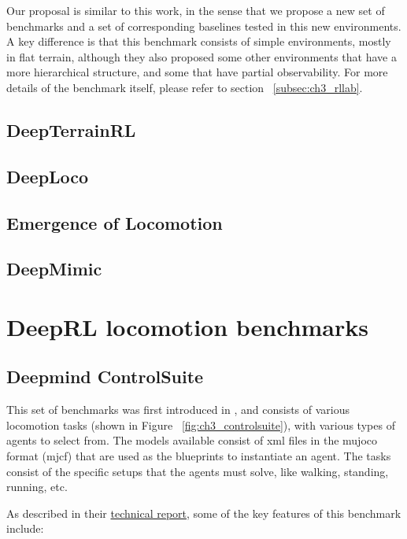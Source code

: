 Our proposal is similar to this work, in the sense that we propose a new set of
benchmarks and a set of corresponding baselines tested in this new environments.
A key difference is that this benchmark consists of simple environments, mostly
in flat terrain, although they also proposed some other environments that have a
more hierarchical structure, and some that have partial observability. For more
details of the benchmark itself, please refer to section ~\ref{subsec:ch3_rllab}.

\subsection{DeepTerrainRL}


\subsection{DeepLoco}


\subsection{Emergence of Locomotion}


\subsection{DeepMimic}

\newpage

\section{DeepRL locomotion benchmarks}

\subsection{Deepmind ControlSuite}

This set of benchmarks was first introduced in \cite{Controlsuite}, and consists 
of various locomotion tasks (shown in Figure ~\ref{fig:ch3_controlsuite}), with various types of agents 
to select from. The models available consist of xml files in the mujoco format (mjcf) 
that are used as the blueprints to instantiate an agent. The tasks consist of the specific
setups that the agents must solve, like walking, standing, running, etc.

\figBenchmarkControlSuite

As described in their \href{https://arxiv.org/pdf/1801.00690.pdf}{technical report},
some of the key features of this benchmark include:

